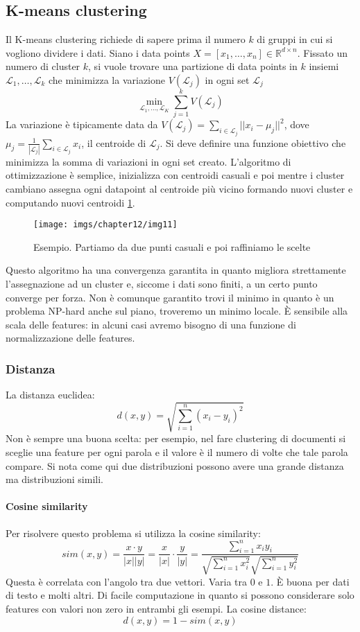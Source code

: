 	\subsection{K-means clustering}
	Il K-means clustering richiede di sapere prima il numero $k$ di gruppi in cui si vogliono dividere i dati.
	Siano i data points $X=[x_1,\dots,x_n]\in\mathbb{R}^{d\times n}$.
	Fissato un numero di cluster $k$, si vuole trovare una partizione di data points in $k$ insiemi $\mathcal{L}_1,\dots,\mathcal{L}_k$ che minimizza la variazione $V(\mathcal{L}_j)$ in ogni set $\mathcal{L}_j$
	$$\min\limits_{\mathcal{L}_1,\dots,\mathcal{L}_K}\sum\limits_{j = 1}^kV(\mathcal{L}_j)$$
	La variazione \`e tipicamente data da $V(\mathcal{L}_j) = \sum\limits_{i\in\mathcal{L}_j}||x_i-\mu_j||^2$, dove $\mu_j = \frac{1}{|\mathcal{L}_j|}\sum\limits_{i\in\mathcal{L}_j}x_i$, il centroide di $\mathcal{L}_j$.
	Si deve definire una funzione obiettivo che minimizza la somma di variazioni in ogni set creato.
	L'algoritmo di ottimizzazione \`e semplice, inizializza con centroidi casuali e poi mentre i cluster cambiano assegna ogni datapoint al centroide pi\`u vicino formando nuovi cluster e computando nuovi centroidi \ref{fig:chapter12-11}.
	\begin{figure}
		\centering
		\texttt{[image: imgs/chapter12/img11]}
		\caption{Esempio. Partiamo da due punti casuali e poi raffiniamo le scelte}
		\label{fig:chapter12-11}
	\end{figure}
	
	Questo algoritmo ha una convergenza garantita in quanto migliora strettamente l'assegnazione ad un cluster e, siccome i dati sono finiti, a un certo punto converge per forza.
	Non \`e comunque garantito trovi il minimo in quanto \`e un problema NP-hard anche sul piano, troveremo un minimo locale.
	\`E sensibile alla scala delle features: in alcuni casi avremo bisogno di una funzione di normalizzazione delle features.

		\subsubsection{Distanza}
		La distanza euclidea:
		$$d(x,y) = \sqrt{\sum\limits_{i=1}^n(x_i-y_i)^2}$$
		Non \`e sempre una buona scelta: per esempio, nel fare clustering di documenti si sceglie una feature per ogni parola e il valore \`e il numero di volte che tale parola compare.
		Si nota come qui due distribuzioni possono avere una grande distanza ma distribuzioni simili.
		
		\paragraph{Cosine similarity}
		Per risolvere questo problema si utilizza la cosine similarity:
		$$sim(x,y) = \frac{x\cdot y}{|x||y|} = \frac{x}{|x|}\cdot\frac{y}{|y|} = \frac{\sum\limits_{i = 1}^n x_iy_i}{\sqrt{\sum\limits_{i = 1}^n x_i^2}\sqrt{\sum\limits_{i = 1}^ny_i^2}}$$
		Questa \`e correlata con l'angolo tra due vettori.
		Varia tra $0$ e $1$.
		\`E buona per dati di testo e molti altri.
		Di facile computazione in quanto si possono considerare solo features con valori non zero in entrambi gli esempi.
		La cosine distance:
		$$d(x,y) = 1-sim(x,y)$$
		

